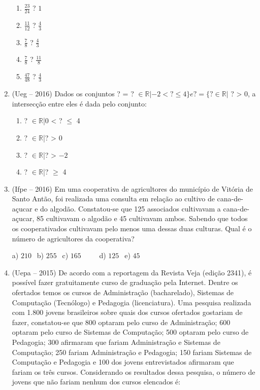\begin{multicols*}{2}
\begin{enumerate}
\begin{enumerate}
	\item $ \frac{23}{24}$ ? $ 1 $ 
	\item $ \frac{11}{12}$ ? $ \frac{4}{3} $ 
	\item $ \frac{7}{8}$ ? $ \frac{4}{3} $ 
	\item $ \frac{7}{8}$ ? $ \frac{11}{8} $ 
	\item $ \frac{47}{48}$ ? $ \frac{4}{3} $

	\end{enumerate}
	
\item (Ueg – 2016) Dados os conjuntos ? = {? $\in \mathbb{R}|-2 <  ?  \leq 4\} e ? = \{? \in \mathbb{R}|$ ? > 0}, a intersecção entre eles é dada pelo conjunto: 
	
	\begin{enumerate}				
	
	\item {? $\in \mathbb{R}$|0 < ? $\leq$ 4} 
	\item {? $\in \mathbb{R}$|? > 0} 
	\item {? $\in \mathbb{R}$|? > $ -2 $} 
	\item {? $\in \mathbb{R}$|? $\geq$ 4} 

	\end{enumerate}

\item (Ifpe – 2016) Em uma cooperativa de agricultores do município de Vitória de Santo Antão, foi realizada uma consulta em relação ao cultivo de cana-de-açucar e do algodão. Constatou-se que 125 associados cultivavam a cana-de-açucar, 85 cultivavam o algodão e 45 cultivavam ambos. Sabendo que todos os cooperativados cultivavam pelo menos uma dessas duas culturas. Qual é o número de agricultores da cooperativa? 

	a) $210 \ \ $ b) $255 \ \ $ c) $165 \ \ \ \ \ \ \ \ \ \ $ d) $125 \ \ $ e) $45 \ \ $

\item (Uepa – 2015) De acordo com a reportagem da Revista Veja (edição 2341), é possível fazer gratuitamente curso de graduação pela Internet. Dentre os ofertados temos os cursos de Administração (bacharelado), Sistemas de Computação (Tecnólogo) e Pedagogia (licenciatura). Uma pesquisa realizada com 1.800 jovens brasileiros sobre quais dos cursos ofertados gostariam de fazer, constatou-se que 800 optaram pelo curso de Administração; 600 optaram pelo curso de Sistemas de Computação; 500 optaram pelo curso de Pedagogia; 300 afirmaram que fariam Administração e Sistemas de Computação; 250 fariam Administração e Pedagogia; 150 fariam Sistemas de Computação e Pedagogia e 100 dos jovens entrevistados afirmaram que fariam os três cursos. Considerando os resultados dessa pesquisa, o número de jovens que não fariam nenhum dos cursos elencados é: 
	

\end{enumerate}
\end{multicols*}
